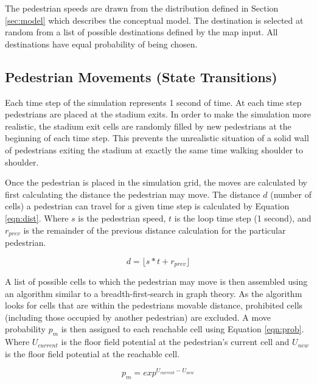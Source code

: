 \documentclass[paper=a4, fontsize=11pt]{scrartcl}
\numberwithin{equation}{section}		%
\numberwithin{figure}{section}			%
\numberwithin{table}{section}		    %
\begin{document}
\noindent
The pedestrian speeds are drawn from the distribution defined in Section \ref{sec:model} which 
describes the conceptual model. The destination is selected at random from a list of possible 
destinations defined by the map input. All destinations have equal probability of being chosen.

\subsection{Pedestrian Movements (State Transitions)} \label{sec:simmove}
Each time step of the simulation represents 1 second of time. At each time step pedestrians are 
placed at the stadium exits. In order to make the simulation more realistic, the stadium exit cells 
are randomly filled by new pedestrians at the beginning of each time step. This prevents the 
unrealistic situation of a solid wall of pedestrians exiting the stadium at exactly the same time 
walking shoulder to shoulder.
 
\noindent
Once the pedestrian is placed in the simulation grid, the moves are calculated by first calculating 
the distance the pedestrian may move. The distance $d$ (number of cells) a pedestrian can travel 
for a given time step is calculated by Equation \ref{eqn:dist}. Where $s$ is the pedestrian speed, 
$t$ is the loop time step (1 second), and $r_{prev}$ is the remainder of the 
previous distance calculation for the particular pedestrian.

\begin{equation} \label{eqn:dist}
d = \lfloor s*t + r_{prev} \rfloor
\end{equation}

\noindent
A list of possible cells to which the pedestrian may move is then assembled using an algorithm 
similar to a breadth-first-search in graph theory. As the algorithm looks for cells that are within 
the pedestrians movable distance, prohibited cells (including those occupied by another pedestrian) 
are excluded. A move probability $p_m$ is then assigned to each reachable cell using Equation 
\ref{eqn:prob}. Where $U_{current}$ is the floor field potential at the pedestrian's current cell 
and $U_{new}$ is the floor field potential at the reachable cell.

\begin{equation} \label{eqn:prob}
p_m = exp^{U_{current} - U_{new}}
\end{equation}
\end{document}
